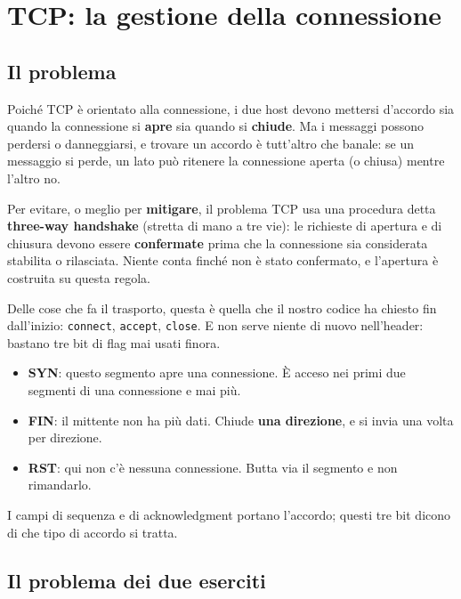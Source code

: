 \chapter{TCP: la gestione della connessione}

\section{Il problema}

Poiché TCP è orientato alla connessione, i due host devono mettersi d'accordo sia quando la connessione
si \textbf{apre} sia quando si \textbf{chiude}. Ma i messaggi possono perdersi o danneggiarsi, e trovare un
accordo è tutt'altro che banale: se un messaggio si perde, un lato può ritenere la connessione aperta (o
chiusa) mentre l'altro no.

Per evitare, o meglio per \textbf{mitigare}, il problema TCP usa una procedura detta \textbf{three-way
handshake} (stretta di mano a tre vie): le richieste di apertura e di chiusura devono essere
\textbf{confermate} prima che la connessione sia considerata stabilita o rilasciata. Niente conta finché non è stato
confermato, e l'apertura è costruita su questa regola.

Delle cose che fa il trasporto, questa è quella che il nostro codice ha chiesto fin dall'inizio: \texttt{connect},
\texttt{accept}, \texttt{close}. E non serve niente di nuovo nell'header: bastano tre bit di flag mai usati finora.

\begin{itemize}
    \item \textbf{SYN}: questo segmento apre una connessione. È acceso nei primi due segmenti di una connessione e mai
          più.
    \item \textbf{FIN}: il mittente non ha più dati. Chiude \textbf{una direzione}, e si invia una volta per direzione.
    \item \textbf{RST}: qui non c'è nessuna connessione. Butta via il segmento e non rimandarlo.
\end{itemize}
I campi di sequenza e di acknowledgment portano l'accordo; questi tre bit dicono di che tipo di accordo si tratta.

\section{Il problema dei due eserciti}

